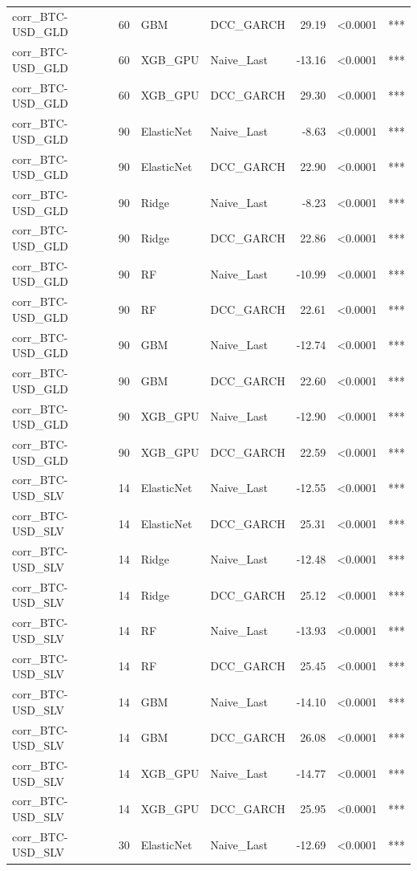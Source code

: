 \begin{table}[H]
\begin{tabular}{llllrrl}
corr_BTC-USD_GLD & 60 & GBM & DCC_GARCH & 29.19 & <0.0001 & *** \\
corr_BTC-USD_GLD & 60 & XGB_GPU & Naive_Last & -13.16 & <0.0001 & *** \\
corr_BTC-USD_GLD & 60 & XGB_GPU & DCC_GARCH & 29.30 & <0.0001 & *** \\
corr_BTC-USD_GLD & 90 & ElasticNet & Naive_Last & -8.63 & <0.0001 & *** \\
corr_BTC-USD_GLD & 90 & ElasticNet & DCC_GARCH & 22.90 & <0.0001 & *** \\
corr_BTC-USD_GLD & 90 & Ridge & Naive_Last & -8.23 & <0.0001 & *** \\
corr_BTC-USD_GLD & 90 & Ridge & DCC_GARCH & 22.86 & <0.0001 & *** \\
corr_BTC-USD_GLD & 90 & RF & Naive_Last & -10.99 & <0.0001 & *** \\
corr_BTC-USD_GLD & 90 & RF & DCC_GARCH & 22.61 & <0.0001 & *** \\
corr_BTC-USD_GLD & 90 & GBM & Naive_Last & -12.74 & <0.0001 & *** \\
corr_BTC-USD_GLD & 90 & GBM & DCC_GARCH & 22.60 & <0.0001 & *** \\
corr_BTC-USD_GLD & 90 & XGB_GPU & Naive_Last & -12.90 & <0.0001 & *** \\
corr_BTC-USD_GLD & 90 & XGB_GPU & DCC_GARCH & 22.59 & <0.0001 & *** \\
corr_BTC-USD_SLV & 14 & ElasticNet & Naive_Last & -12.55 & <0.0001 & *** \\
corr_BTC-USD_SLV & 14 & ElasticNet & DCC_GARCH & 25.31 & <0.0001 & *** \\
corr_BTC-USD_SLV & 14 & Ridge & Naive_Last & -12.48 & <0.0001 & *** \\
corr_BTC-USD_SLV & 14 & Ridge & DCC_GARCH & 25.12 & <0.0001 & *** \\
corr_BTC-USD_SLV & 14 & RF & Naive_Last & -13.93 & <0.0001 & *** \\
corr_BTC-USD_SLV & 14 & RF & DCC_GARCH & 25.45 & <0.0001 & *** \\
corr_BTC-USD_SLV & 14 & GBM & Naive_Last & -14.10 & <0.0001 & *** \\
corr_BTC-USD_SLV & 14 & GBM & DCC_GARCH & 26.08 & <0.0001 & *** \\
corr_BTC-USD_SLV & 14 & XGB_GPU & Naive_Last & -14.77 & <0.0001 & *** \\
corr_BTC-USD_SLV & 14 & XGB_GPU & DCC_GARCH & 25.95 & <0.0001 & *** \\
corr_BTC-USD_SLV & 30 & ElasticNet & Naive_Last & -12.69 & <0.0001 & *** \\

\end{tabular}
\end{table}
